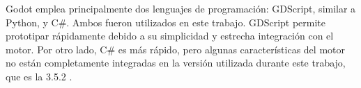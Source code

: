 Godot emplea principalmente dos lenguajes de programación: GDScript, similar a Python, y C\#. Ambos fueron utilizados en este trabajo. GDScript permite prototipar rápidamente debido a su simplicidad y estrecha integración con el motor. Por otro lado, C\# es más rápido, pero algunas características del motor no están completamente integradas en la versión utilizada durante este trabajo, que es la 3.5.2 \cite{GodotCSharpGDDifferences}.
